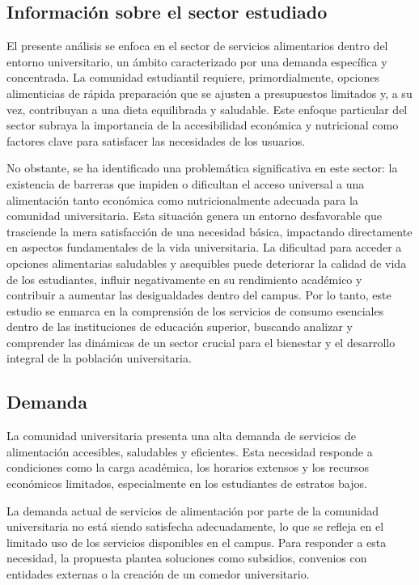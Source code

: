 \documentclass[letterpaper, 11pt]{report}
\begin{document}
\subsection{Información sobre el sector estudiado}

El presente análisis se enfoca en el sector de servicios alimentarios dentro
del entorno universitario, un ámbito caracterizado por una demanda específica y
concentrada. La comunidad estudiantil requiere, primordialmente, opciones
alimenticias de rápida preparación que se ajusten a presupuestos limitados y, a
su vez, contribuyan a una dieta equilibrada y saludable. Este enfoque
particular del sector subraya la importancia de la accesibilidad económica y
nutricional como factores clave para satisfacer las necesidades de los
usuarios.

No obstante, se ha identificado una problemática significativa en este sector:
la existencia de barreras que impiden o dificultan el acceso universal a una
alimentación tanto económica como nutricionalmente adecuada para la comunidad
universitaria. Esta situación genera un entorno desfavorable que trasciende la
mera satisfacción de una necesidad básica, impactando directamente en aspectos
fundamentales de la vida universitaria. La dificultad para acceder a opciones
alimentarias saludables y asequibles puede deteriorar la calidad de vida de los
estudiantes, influir negativamente en su rendimiento académico y contribuir a
aumentar las desigualdades dentro del campus. Por lo tanto, este estudio se
enmarca en la comprensión de los servicios de consumo esenciales dentro de las
instituciones de educación superior, buscando analizar y comprender las
dinámicas de un sector crucial para el bienestar y el desarrollo integral de la
población universitaria.

\subsection{Demanda}

La comunidad universitaria presenta una alta demanda de servicios de
alimentación accesibles, saludables y eficientes. Esta necesidad responde a
condiciones como la carga académica, los horarios extensos y los recursos
económicos limitados, especialmente en los estudiantes de estratos bajos.

La demanda actual de servicios de alimentación por parte de la comunidad
universitaria no está siendo satisfecha adecuadamente, lo que se refleja en el
limitado uso de los servicios disponibles en el campus. Para responder a esta
necesidad, la propuesta plantea soluciones como subsidios, convenios con
entidades externas o la creación de un comedor universitario.
\end{document}
